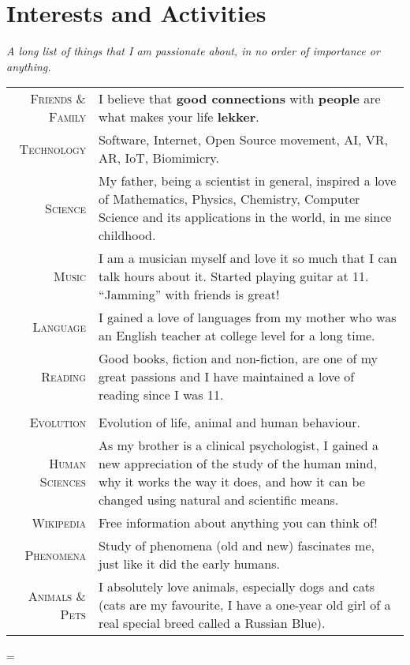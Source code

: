 \documentclass[a4paper,10pt,notitlepage]{article}
\newenvironment{absolutelynopagebreak}
  {\par\nobreak\vfil\penalty0\vfilneg
   \vtop\bgroup}
  {\par\xdef\tpd{\the\prevdepth}\egroup
   \prevdepth=\tpd}
\begin{document}
\begin{absolutelynopagebreak}
\begin{tabular}{r|p{11cm}}
\end{tabular}

\section{Interests and Activities}

\textit{A long list of things that I am passionate about, in no order of importance or anything.} \\

\begin{tabular}{r|p{11cm}}

 \textsc{Friends \& Family} & I believe that \textbf{good connections} with \textbf{people} are what makes your life \textbf{lekker}. \\
 \textsc{Technology} & Software, Internet, Open Source movement, AI, VR, AR, IoT, Biomimicry. \\
 \textsc{Science} & My father, being a scientist in general, inspired a love of Mathematics, Physics, Chemistry, Computer Science and its applications in the world, in me since childhood. \\
 \textsc{Music} & I am a musician myself and love it so much that I can talk hours about it. Started playing guitar at 11. ``Jamming'' with friends is great! \\
 \textsc{Language} & I gained a love of languages from my mother who was an English teacher at college level for a long time. \\
 \textsc{Reading} & Good books, fiction and non-fiction, are one of my great passions and I have maintained a love of reading since I was 11. \\
 
 \multicolumn{2}{c}{}\\
  
 \textsc{Evolution} & Evolution of life, animal and human behaviour. \\
 \textsc{Human Sciences} & As my brother is a clinical psychologist, I gained a new appreciation of the study of the human mind, why it works the way it does, and how it can be changed using natural and scientific means. \\
 \textsc{Wikipedia} & Free information about anything you can think of! \\
 \textsc{Phenomena} & Study of phenomena (old and new) fascinates me, just like it did the early humans. \\
 \textsc{Animals \& Pets} & I absolutely love animals, especially dogs and cats (cats are my favourite, I have a one-year old girl of a real special breed called a Russian Blue). \\
 

\end{tabular}
\end{absolutelynopagebreak}
\end{document}
